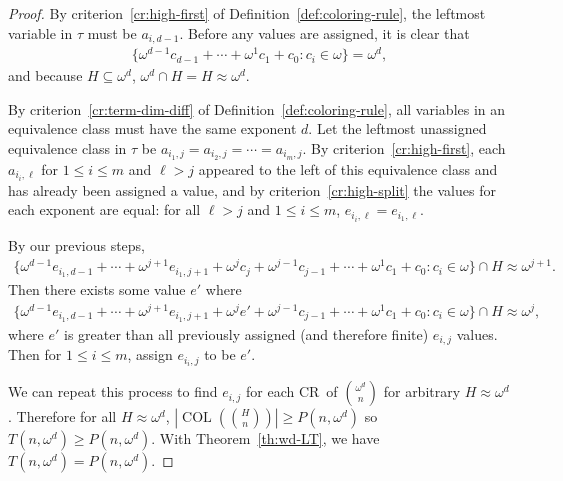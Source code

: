 \documentclass[10pt,a4paper]{article}
\newcommand{\om}{\omega}
\newcommand{\oequiv}{\approx}
\newcommand{\COL}{\operatorname{COL}}
\newcommand{\crulenospace}{CR}
\newcommand{\crule}{\crulenospace~}
\newcommand{\numpoints}{n}
\newcommand{\inumpoints}{i}
\newcommand{\idegr}{j}
\newcommand{\commonconst}{a}
\theoremstyle{plain}
\theoremstyle{definition}
\begin{document}
\begin{proof}
By criterion~\ref{cr:high-first} of 
Definition~\ref{def:coloring-rule}, 
the leftmost variable in $\tau$ must be $\commonconst_{\inumpoints,d-1}$. Before any values are assigned, it is clear that \begin{align*}\{ \om^{d-1} c_{d-1} + \cdots + \om^1 c_1 + c_0 : c_i \in \om\} = \om^{d},\end{align*} and because $H \subseteq \om^{d}$, $\om^{d} \cap H = H \oequiv \om^{d}$.

By criterion~\ref{cr:term-dim-diff} of 
Definition~\ref{def:coloring-rule}, all variables in an equivalence class must have the same exponent $d$. Let the leftmost unassigned equivalence class in $\tau$ be $\commonconst_{\inumpoints_1,\idegr} = \commonconst_{\inumpoints_2,\idegr} = \cdots = \commonconst_{\inumpoints_m,\idegr}$.
By criterion~\ref{cr:high-first}, each $\commonconst_{\inumpoints_i,\ell}$ for $1 \leq i \leq m$ and $\ell > \idegr$ appeared to the left of this equivalence class and has already been assigned a value, and by criterion~\ref{cr:high-split} the values for each exponent are equal: for all $\ell > \idegr$ and $1 \leq i \leq m$, $e_{\inumpoints_i,\ell} = e_{\inumpoints_1,\ell}$.

By our previous steps, \begin{multline*}\{ \om^{d-1} e_{\inumpoints_1,d-1} + \cdots + \om^{\idegr+1} e_{\inumpoints_1,\idegr+1} + \om^{\idegr} c_{\idegr} + \om^{\idegr-1} c_{\idegr-1} + \cdots + \om^1 c_1 + c_0 : c_i \in \om\} \cap H \oequiv \om^{\idegr+1}.\end{multline*}
Then there exists some value $e'$ where \begin{multline*}\{ \om^{d-1} e_{\inumpoints_1,d-1} + \cdots + \om^{\idegr+1} e_{\inumpoints_1,\idegr+1} + \om^{\idegr} e' + \om^{\idegr-1} c_{\idegr-1} + \cdots + \om^1 c_1 + c_0 : c_i \in \om\} \cap H \oequiv \om^{\idegr},
\end{multline*} where $e'$ is greater than all previously assigned (and therefore finite) $e_{\inumpoints,\idegr}$ values. Then for $1 \leq i \leq m$, assign $e_{\inumpoints_i,\idegr}$ to be $e'$.

We can repeat this process to find $e_{\inumpoints,\idegr}$ for each \crule of $\binom{\om^d}{\numpoints}$ for arbitrary $H \oequiv \om^{d}$. Therefore for all 
$H \oequiv \omega^d$,
$\left|\COL\left(\binom{H}{\numpoints}\right)\right|\geq P(\numpoints,\om^d)$ so
$T(\numpoints,\om^d) \geq P\left(\numpoints, \om^d\right)$. With
Theorem~\ref{th:wd-LT}, we have
$T(\numpoints,\om^d) = P\left(\numpoints, \om^d\right)$.

\end{proof}
\end{document}
